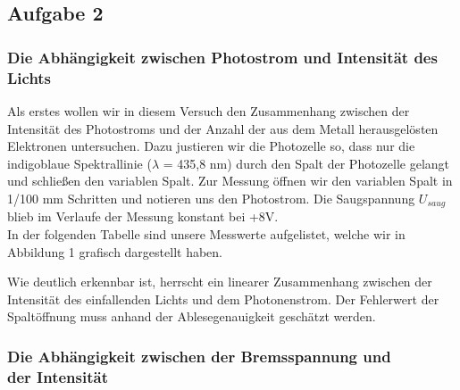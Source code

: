 \subsection{Aufgabe 2}
\subsubsection{Die Abhängigkeit zwischen Photostrom und Intensität des Lichts}
Als erstes wollen wir in diesem Versuch den Zusammenhang zwischen der Intensität des Photostroms und der Anzahl der aus dem Metall herausgelösten Elektronen untersuchen. Dazu justieren wir die Photozelle so, dass nur die indigoblaue Spektrallinie (\(\lambda\) = 435,8 nm) durch den Spalt der Photozelle gelangt und schließen den variablen Spalt. Zur Messung öffnen wir den variablen Spalt in 1/100 mm Schritten und notieren uns den Photostrom. Die Saugspannung \(U_{saug}\) blieb im Verlaufe der Messung konstant bei +8V.\\
In der folgenden Tabelle sind unsere Messwerte aufgelistet, welche wir in Abbildung 1 grafisch dargestellt haben.\\

\begin{center}

\end{center}

\begin{center}
\begin{minipage}{\linewidth}
\centering
{}
\label{ips}
\end{minipage}
\end{center}

Wie deutlich erkennbar ist, herrscht ein linearer Zusammenhang zwischen der Intensität des einfallenden Lichts und dem Photonenstrom. Der Fehlerwert der Spaltöffnung muss anhand der Ablesegenauigkeit geschätzt werden.

\subsubsection{Die Abhängigkeit zwischen der Bremsspannung und\\ der Intensität}

